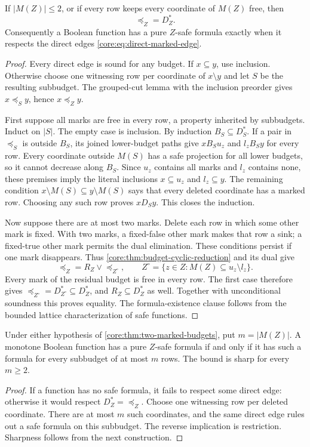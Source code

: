 \begin{theorem}
\label{core:thm:two-marked-budgets}
If $|M(Z)|\leq2$, or if every row keeps every coordinate of $M(Z)$ free,
then
\[
 \preceq_Z=D_Z^*.
\]
Consequently a Boolean function has a pure $Z$-safe formula exactly when
it respects the direct edges \eqref{core:eq:direct-marked-edge}.
\end{theorem}
\begin{proof}
Every direct edge is sound for any budget. If $x\subseteq y$, use
inclusion. Otherwise choose one witnessing row per coordinate of
$x\setminus y$ and let $S$ be the resulting subbudget. The grouped-cut
lemma with the inclusion preorder gives $x\preceq_Sy$, hence
$x\preceq_Zy$.

First suppose all marks are free in every row, a property inherited by
subbudgets. Induct on $|S|$. The empty case is inclusion. By induction
$B_S\subseteq D_S^*$. If a pair in $\preceq_S$ is outside $B_S$, its
joined lower-budget paths give $xB_Su_z$ and $l_zB_Sy$ for every row.
Every coordinate outside $M(S)$ has a safe projection for all lower
budgets, so it cannot decrease along $B_S$. Since $u_z$ contains all
marks and $l_z$ contains none, these premises imply the literal
inclusions $x\subseteq u_z$ and $l_z\subseteq y$. The remaining
condition $x\setminus M(S)\subseteq y\setminus M(S)$ says that every
deleted coordinate has a marked row. Choosing any such row proves
$xD_Sy$. This closes the induction.

Now suppose there are at most two marks. Delete each row in which some
other mark is fixed. With two marks, a fixed-false other mark makes that
row a sink; a fixed-true other mark permits the dual elimination.
These conditions persist if one mark disappears. Thus
\cref{core:thm:budget-cyclic-reduction} and its dual give
\[
 \preceq_Z=R_Z\vee\preceq_{Z^\circ},\qquad
 Z^\circ=\{z\in Z:M(Z)\subseteq u_z\setminus l_z\}.
\]
Every mark of the residual budget is free in every row. The first case
therefore gives $\preceq_{Z^\circ}=D_{Z^\circ}^*\subseteq D_Z^*$,
and $R_Z\subseteq D_Z^*$ as well. Together with unconditional soundness
this proves equality. The formula-existence clause follows from the
bounded lattice characterization of safe functions.
\end{proof}

\begin{corollary}
\label{core:cor:marked-helly}
Under either hypothesis of \cref{core:thm:two-marked-budgets}, put
$m=|M(Z)|$. A monotone Boolean function has a pure $Z$-safe formula if
and only if it has such a formula for every subbudget of at most $m$ rows.
The bound is sharp for every $m\geq2$.
\end{corollary}
\begin{proof}
If a function has no safe formula, it fails to respect some direct edge:
otherwise it would respect $D_Z^*=\preceq_Z$. Choose one witnessing row
per deleted coordinate. There are at most $m$ such coordinates, and the
same direct edge rules out a safe formula on this subbudget. The reverse
implication is restriction. Sharpness follows from the next construction.
\end{proof}

